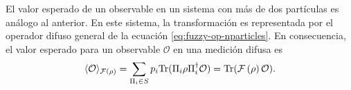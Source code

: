 El valor esperado de un observable en un sistema con más de dos partículas es análogo al anterior. En este sistema, la transformación es representada por el operador difuso general de la ecuación {\eqref{eq:fuzzy-op-nparticles}}. En consecuencia, el valor esperado para un observable $\mathcal{O}$ en una medición difusa es\begin{equation}\label{eq:expected-value-fm-general}
    \langle \mathcal{O}\rangle_{\mathcal{F}\left(\rho\right)}=\sum_{\Pi_i\in S}p_i{\rm Tr}(\Pi_{i}\rho\Pi_{i}^{\dagger}\mathcal{O}) ={\rm Tr}(\mathcal{F}\left(\rho\right)\mathcal{O}).
\end{equation}



 

